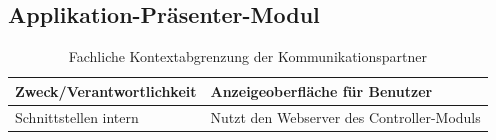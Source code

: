 \subsection{Applikation-Präsenter-Modul}
\begin{table}[th]
	\begin{tabularx}{\textwidth}{X X}
		\hline
		Zweck/Verantwortlichkeit & Anzeigeoberfläche für Benutzer \\
		\hline
		Schnittstellen intern & Nutzt den Webserver des Controller-Moduls\\
		\hline
	\end{tabularx} 
	\caption{Fachliche Kontextabgrenzung der Kommunikationspartner}
	\label{tab:FachlicheKontextabgrenzungDerKommunikationspartner}
\end{table}
\clearpage
